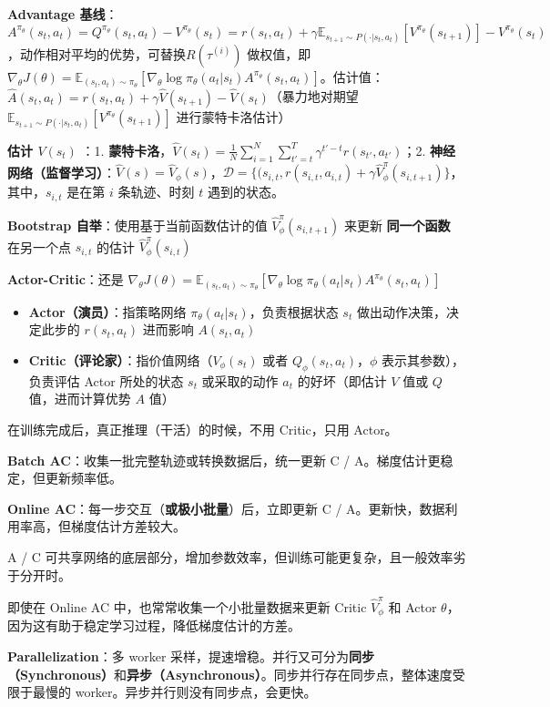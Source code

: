 \documentclass[
  8pt]{extarticle}
\providecommand{\tightlist}{%
  \setlength{\itemsep}{0pt}\setlength{\parskip}{0pt}}
\begin{document}
\begin{multicols*}{4}
\textbf{Advantage
基线}：\(A^{\pi_\theta}(s_t, a_t) = Q^{\pi_\theta}(s_t, a_t) - V^{\pi_\theta}(s_t) = r(s_t, a_t) + \gamma \mathbb{E}_{s_{t+1} \sim P(\cdot|s_t, a_t)} [V^{\pi_\theta}(s_{t+1})] - V^{\pi_\theta}(s_t)\)，动作相对平均的优势，可替换\(R(\tau^{(i)})\)
做权值，即
\(\nabla_\theta J(\theta) = \mathbb{E}_{(s_t, a_t) \sim \pi_\theta} [ \nabla_\theta \log \pi_\theta(a_t | s_t) A^{\pi_\theta}(s_t, a_t) ]\)。估计值：\(\hat{A}(s_t, a_t) = r(s_t, a_t) + \gamma \hat{V}(s_{t+1}) - \hat{V}(s_t)\)（暴力地对期望
\(\mathbb{E}_{s_{t+1} \sim P(\cdot|s_t, a_t)} [V^{\pi_\theta}(s_{t+1})]\)
进行蒙特卡洛估计）

\textbf{估计 \(V(s_t)\)} ：1.
\textbf{蒙特卡洛}，\(\hat{V}(s_t) = \frac{1}{N} \sum_{i=1}^{N} \sum_{t'=t}^{T} \gamma^{t' - t} r(s_{t'}, a_{t'})\)；2.
\textbf{神经网络（监督学习）}：\(\hat{V}(s) = \hat{V}_{\phi}(s)\)，\(\mathcal{D} = \{ (s_{i,t}, r(s_{i,t}, a_{i,t}) + \gamma \hat{V}_{\phi}^{\pi}(s_{i,t+1}) \}\)，其中，\(s_{i,t}\)
是在第 \(i\) 条轨迹、时刻 \(t\) 遇到的状态。

\textbf{Bootstrap 自举}：使用基于当前函数估计的值
\(\hat{V}_{\phi}^{\pi}(s_{i,t+1})\) 来更新 \textbf{同一个函数}
在另一个点 \(s_{i,t}\) 的估计 \(\hat{V}_{\phi}^{\pi}(s_{i,t})\)

\textbf{Actor-Critic}：还是
\(\nabla_\theta J(\theta) = \mathbb{E}_{(s_t, a_t) \sim \pi_\theta} [ \nabla_\theta \log \pi_\theta(a_t | s_t) A^{\pi_\theta}(s_t, a_t) ]\)

\begin{itemize}
\tightlist
\item
  \textbf{Actor（演员）}：指策略网络
  \(\pi_\theta(a_t|s_t)\)，负责根据状态 \(s_t\) 做出动作决策，决定此步的
  \(r(s_t, a_t)\) 进而影响 \(A(s_t, a_t)\)
\item
  \textbf{Critic（评论家）}：指价值网络（\(V_{\phi}(s_t)\) 或者
  \(Q_{\phi}(s_t, a_t)\)，\(\phi\) 表示其参数），负责评估 Actor
  所处的状态 \(s_t\) 或采取的动作 \(a_t\) 的好坏（即估计 \(V\) 值或
  \(Q\) 值，进而计算优势 \(A\) 值）
\end{itemize}

在训练完成后，真正推理（干活）的时候，不用 Critic，只用 Actor。

\textbf{Batch AC}：收集一批完整轨迹或转换数据后，统一更新 C /
A。梯度估计更稳定，但更新频率低。

\textbf{Online AC}：每一步交互（\textbf{或极小批量}）后，立即更新 C /
A。更新快，数据利用率高，但梯度估计方差较大。

A / C
可共享网络的底层部分，增加参数效率，但训练可能更复杂，且一般效率劣于分开时。

即使在 Online AC 中，也常常收集一个小批量数据来更新 Critic
\(\hat{V}_\phi^\pi\) 和 Actor
\(\theta\)，因为这有助于稳定学习过程，降低梯度估计的方差。

\textbf{Parallelization}：多 worker
采样，提速增稳。并行又可分为\textbf{同步（Synchronous）}和\textbf{异步（Asynchronous）}。同步并行存在同步点，整体速度受限于最慢的
worker。异步并行则没有同步点，会更快。

\end{multicols*}
\end{document}
